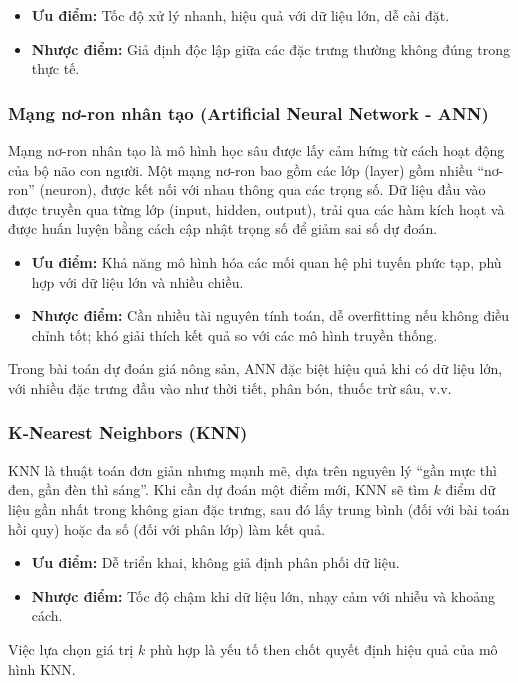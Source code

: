 \begin{itemize}
    \item \textbf{Ưu điểm:} Tốc độ xử lý nhanh, hiệu quả với dữ liệu lớn, dễ cài đặt.
    \item \textbf{Nhược điểm:} Giả định độc lập giữa các đặc trưng thường không đúng trong thực tế.
\end{itemize}

\subsubsection{ Mạng nơ-ron nhân tạo (Artificial Neural Network - ANN)}

Mạng nơ-ron nhân tạo là mô hình học sâu được lấy cảm hứng từ cách hoạt động của bộ não con người. Một mạng nơ-ron bao gồm các lớp (layer) gồm nhiều “nơ-ron” (neuron), được kết nối với nhau thông qua các trọng số. Dữ liệu đầu vào được truyền qua từng lớp (input, hidden, output), trải qua các hàm kích hoạt và được huấn luyện bằng cách cập nhật trọng số để giảm sai số dự đoán.

\begin{itemize}
    \item \textbf{Ưu điểm:} Khả năng mô hình hóa các mối quan hệ phi tuyến phức tạp, phù hợp với dữ liệu lớn và nhiều chiều.
    \item \textbf{Nhược điểm:} Cần nhiều tài nguyên tính toán, dễ overfitting nếu không điều chỉnh tốt; khó giải thích kết quả so với các mô hình truyền thống.
\end{itemize}

Trong bài toán dự đoán giá nông sản, ANN đặc biệt hiệu quả khi có dữ liệu lớn, với nhiều đặc trưng đầu vào như thời tiết, phân bón, thuốc trừ sâu, v.v.

\subsubsection{ K-Nearest Neighbors (KNN)}

KNN là thuật toán đơn giản nhưng mạnh mẽ, dựa trên nguyên lý “gần mực thì đen, gần đèn thì sáng”. Khi cần dự đoán một điểm mới, KNN sẽ tìm \( k \) điểm dữ liệu gần nhất trong không gian đặc trưng, sau đó lấy trung bình (đối với bài toán hồi quy) hoặc đa số (đối với phân lớp) làm kết quả.

\begin{itemize}
    \item \textbf{Ưu điểm:} Dễ triển khai, không giả định phân phối dữ liệu.
    \item \textbf{Nhược điểm:} Tốc độ chậm khi dữ liệu lớn, nhạy cảm với nhiễu và khoảng cách.
\end{itemize}

Việc lựa chọn giá trị \( k \) phù hợp là yếu tố then chốt quyết định hiệu quả của mô hình KNN.

